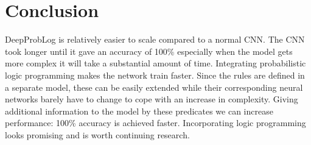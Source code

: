 \section{Conclusion}
DeepProbLog is relatively easier to scale compared to a normal CNN. The CNN took longer until it gave an accuracy of 100\% especially when the model gets more complex it will take a substantial amount of time. Integrating probabilistic logic programming makes the network train faster. Since the rules are defined in a separate model, these can be easily extended while their corresponding neural networks barely have to change to cope with an increase in complexity. Giving additional information to the model by these predicates we can increase performance: 100\% accuracy is achieved faster. Incorporating logic programming looks promising and is worth continuing research. 